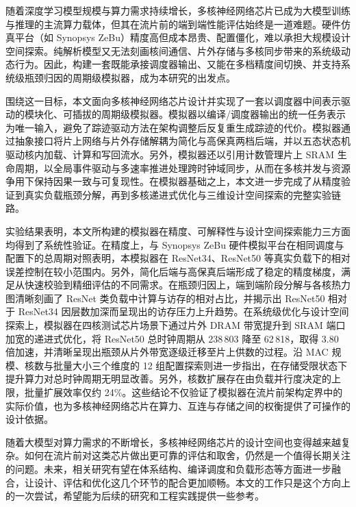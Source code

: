 


随着深度学习模型规模与算力需求持续增长，多核神经网络芯片已成为大模型训练与推理的主流算力载体，但其在流片前的端到端性能评估始终是一道难题。硬件仿真平台（如 Synopsys ZeBu）精度高但成本昂贵、配置僵化，难以承担大规模设计空间探索。纯解析模型又无法刻画核间通信、片外存储与多核同步带来的系统级动态行为。因此，构建一套既能承接调度器输出、又能在多档精度间切换、并支持系统级瓶颈归因的周期级模拟器，成为本研究的出发点。

围绕这一目标，本文面向多核神经网络芯片设计并实现了一套以调度器中间表示驱动的模块化、可插拔的周期级模拟器。模拟器以编译/调度器输出的统一任务表示为唯一输入，避免了踪迹驱动方法在架构调整后反复重生成踪迹的代价。模拟器通过抽象接口将片上网络与片外存储解耦为简化与高保真两档后端，并以五态状态机驱动核内加载、计算和写回流水。另外，模拟器还以引用计数管理片上 SRAM 生命周期，以全局事件驱动与多速率推进处理跨时钟域同步，从而在多核并发与资源争用下保持因果一致与可复现性。在模拟器基础之上，本文进一步完成了从精度验证到真实负载瓶颈分解，再到多核递进式优化与三维设计空间探索的完整实验链路。

实验结果表明，本文所构建的模拟器在精度、可解释性与设计空间探索能力三方面均得到了系统性验证。在精度上，与 Synopsys ZeBu 硬件模拟平台在相同调度与配置下的总周期对照表明，本模拟器在 ResNet34、ResNet50 等真实负载下的相对误差控制在较小范围内。另外，简化后端与高保真后端形成了稳定的精度梯度，满足从快速校验到精细评估的不同需求。在瓶颈归因上，端到端阶段分解与各核热力图清晰刻画了 ResNet 类负载中计算与访存的相对占比，并揭示出 ResNet50 相对于 ResNet34 因层数加深而呈现出的访存压力上升趋势。在系统级优化与设计空间探索上，模拟器在四核测试芯片场景下通过片外 DRAM 带宽提升到 SRAM 端口加宽的递进式优化，将 ResNet50 总时钟周期从 238\,803 降至 62\,818，取得 3.80 倍加速，并清晰呈现出瓶颈从片外带宽逐级迁移至片上供数的过程。沿 MAC 规模、核数与批量大小三个维度的 12 组配置探索则进一步指出，在存储受限状态下提升算力对总时钟周期无明显改善。另外，核数扩展存在由负载并行度决定的上限，批量扩展效率仅约 24\%。这些结论不仅验证了模拟器在流片前架构定界中的实际价值，也为多核神经网络芯片在算力、互连与存储之间的权衡提供了可操作的设计依据。


随着大模型对算力需求的不断增长，多核神经网络芯片的设计空间也变得越来越复杂。如何在流片前对这类芯片做出更可靠的评估和取舍，仍然是一个值得长期关注的问题。未来，相关研究有望在体系结构、编译调度和负载形态等方面进一步融合，让设计、评估和优化这几个环节的配合更加顺畅。本文的工作只是这个方向上的一次尝试，希望能为后续的研究和工程实践提供一些参考。
